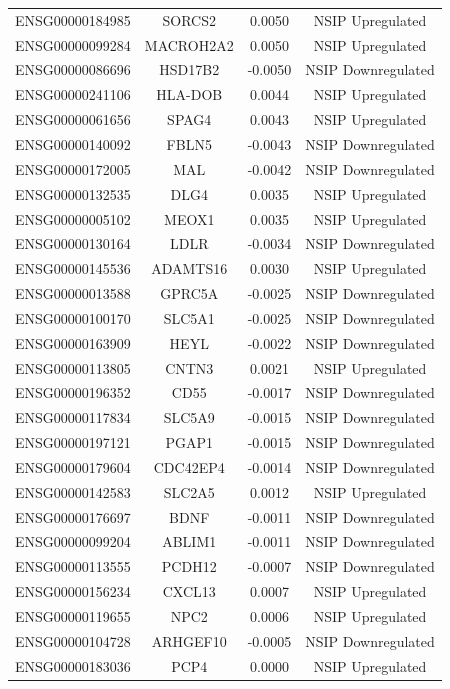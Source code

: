 \documentclass[
]{article}
\begin{document}
\begin{singlespace}
\begin{longtable}[t]{lccc}
\addlinespace
ENSG00000184985 & SORCS2 & 0.0050 & NSIP Upregulated\\
ENSG00000099284 & MACROH2A2 & 0.0050 & NSIP Upregulated\\
ENSG00000086696 & HSD17B2 & -0.0050 & NSIP Downregulated\\
ENSG00000241106 & HLA-DOB & 0.0044 & NSIP Upregulated\\
ENSG00000061656 & SPAG4 & 0.0043 & NSIP Upregulated\\
\addlinespace
ENSG00000140092 & FBLN5 & -0.0043 & NSIP Downregulated\\
ENSG00000172005 & MAL & -0.0042 & NSIP Downregulated\\
ENSG00000132535 & DLG4 & 0.0035 & NSIP Upregulated\\
ENSG00000005102 & MEOX1 & 0.0035 & NSIP Upregulated\\
ENSG00000130164 & LDLR & -0.0034 & NSIP Downregulated\\
\addlinespace
ENSG00000145536 & ADAMTS16 & 0.0030 & NSIP Upregulated\\
ENSG00000013588 & GPRC5A & -0.0025 & NSIP Downregulated\\
ENSG00000100170 & SLC5A1 & -0.0025 & NSIP Downregulated\\
ENSG00000163909 & HEYL & -0.0022 & NSIP Downregulated\\
ENSG00000113805 & CNTN3 & 0.0021 & NSIP Upregulated\\
\addlinespace
ENSG00000196352 & CD55 & -0.0017 & NSIP Downregulated\\
ENSG00000117834 & SLC5A9 & -0.0015 & NSIP Downregulated\\
ENSG00000197121 & PGAP1 & -0.0015 & NSIP Downregulated\\
ENSG00000179604 & CDC42EP4 & -0.0014 & NSIP Downregulated\\
ENSG00000142583 & SLC2A5 & 0.0012 & NSIP Upregulated\\
\addlinespace
ENSG00000176697 & BDNF & -0.0011 & NSIP Downregulated\\
ENSG00000099204 & ABLIM1 & -0.0011 & NSIP Downregulated\\
ENSG00000113555 & PCDH12 & -0.0007 & NSIP Downregulated\\
ENSG00000156234 & CXCL13 & 0.0007 & NSIP Upregulated\\
ENSG00000119655 & NPC2 & 0.0006 & NSIP Upregulated\\
\addlinespace
ENSG00000104728 & ARHGEF10 & -0.0005 & NSIP Downregulated\\
ENSG00000183036 & PCP4 & 0.0000 & NSIP Upregulated\\*
\end{longtable}
\endgroup{}




\end{singlespace}
\end{document}
